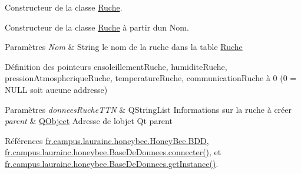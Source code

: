 Constructeur de la classe \hyperlink{classfr_1_1campus_1_1laurainc_1_1honeybee_1_1_ruche}{Ruche}.

Constructeur de la classe \hyperlink{classfr_1_1campus_1_1laurainc_1_1honeybee_1_1_ruche}{Ruche} à partir d\textquotesingle{}un Nom.


\begin{DoxyParams}{Paramètres}
{\em Nom} & String le nom de la ruche dans la table \hyperlink{classfr_1_1campus_1_1laurainc_1_1honeybee_1_1_ruche}{Ruche}\\
\hline
\end{DoxyParams}
Définition des pointeurs ensoleillement\+Ruche, humidite\+Ruche, pression\+Atmospherique\+Ruche, temperature\+Ruche, communication\+Ruche à 0 (0 = N\+U\+LL soit aucune addresse)


\begin{DoxyParams}{Paramètres}
{\em donnees\+Ruche\+T\+TN} & Q\+String\+List Informations sur la ruche à créer \\
\hline
{\em parent} & \hyperlink{class_q_object}{Q\+Object} Adresse de l\textquotesingle{}objet Qt parent \\
\hline
\end{DoxyParams}


Références \hyperlink{classfr_1_1campus_1_1laurainc_1_1honeybee_1_1_honey_bee_abfb4f6cc1c8bb793c37ccb8408abc51c}{fr.\+campus.\+laurainc.\+honeybee.\+Honey\+Bee.\+B\+DD}, \hyperlink{classfr_1_1campus_1_1laurainc_1_1honeybee_1_1_base_de_donnees_a08564ea7dccde161d6eac4b8879401bb}{fr.\+campus.\+laurainc.\+honeybee.\+Base\+De\+Donnees.\+connecter()}, et \hyperlink{classfr_1_1campus_1_1laurainc_1_1honeybee_1_1_base_de_donnees_a9c2484cfb87f90e46cf878eb7803abb2}{fr.\+campus.\+laurainc.\+honeybee.\+Base\+De\+Donnees.\+get\+Instance()}.


